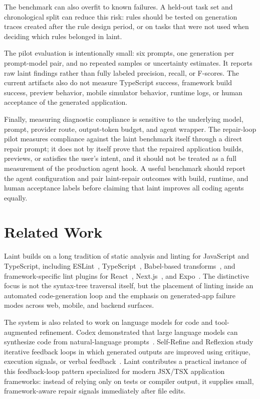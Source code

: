 \documentclass[11pt]{article}
\begin{document}
The benchmark can also overfit to known failures. A held-out task set and chronological split can reduce this risk: rules should be tested on generation traces created after the rule design period, or on tasks that were not used when deciding which rules belonged in laint.

The pilot evaluation is intentionally small: six prompts, one generation per prompt-model pair, and no repeated samples or uncertainty estimates. It reports raw laint findings rather than fully labeled precision, recall, or F-scores. The current artifacts also do not measure TypeScript success, framework build success, preview behavior, mobile simulator behavior, runtime logs, or human acceptance of the generated application.

Finally, measuring diagnostic compliance is sensitive to the underlying model, prompt, provider route, output-token budget, and agent wrapper. The repair-loop pilot measures compliance against the laint benchmark itself through a direct repair prompt; it does not by itself prove that the repaired application builds, previews, or satisfies the user's intent, and it should not be treated as a full measurement of the production agent hook. A useful benchmark should report the agent configuration and pair laint-repair outcomes with build, runtime, and human acceptance labels before claiming that laint improves all coding agents equally.

\section{Related Work}

Laint builds on a long tradition of static analysis and linting for JavaScript and TypeScript, including ESLint~\cite{eslint}, TypeScript~\cite{typescript}, Babel-based transforms~\cite{babel}, and framework-specific lint plugins for React~\cite{react}, Next.js~\cite{nextjs}, and Expo~\cite{expo}. The distinctive focus is not the syntax-tree traversal itself, but the placement of linting inside an automated code-generation loop and the emphasis on generated-app failure modes across web, mobile, and backend surfaces.

The system is also related to work on language models for code and tool-augmented refinement. Codex demonstrated that large language models can synthesize code from natural-language prompts~\cite{codex}. Self-Refine and Reflexion study iterative feedback loops in which generated outputs are improved using critique, execution signals, or verbal feedback~\cite{selfrefine,reflexion}. Laint contributes a practical instance of this feedback-loop pattern specialized for modern JSX/TSX application frameworks: instead of relying only on tests or compiler output, it supplies small, framework-aware repair signals immediately after file edits.
\end{document}
